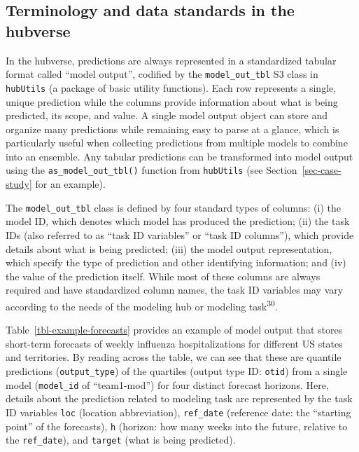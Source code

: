 \documentclass[
]{article}
\begin{document}
\subsection{Terminology and data standards in the
hubverse}\label{terminology-and-data-standards-in-the-hubverse}

In the hubverse, predictions are always represented in a standardized
tabular format called ``model output'', codified by the
\texttt{model\_out\_tbl} S3 class in \texttt{hubUtils} (a package of
basic utility functions). Each row represents a single, unique
prediction while the columns provide information about what is being
predicted, its scope, and value. A single model output object can store
and organize many predictions while remaining easy to parse at a glance,
which is particularly useful when collecting predictions from multiple
models to combine into an ensemble. Any tabular predictions can be
transformed into model output using the \texttt{as\_model\_out\_tbl()}
function from \texttt{hubUtils} (see Section~\ref{sec-case-study} for an
example).

The \texttt{model\_out\_tbl} class is defined by four standard types of
columns: (i) the model ID, which denotes which model has produced the
prediction; (ii) the task IDs (also referred to as ``task ID variables''
or ``task ID columns''), which provide details about what is being
predicted; (iii) the model output representation, which specify the type
of prediction and other identifying information; and (iv) the value of
the prediction itself. While most of these columns are always required
and have standardized column names, the task ID variables may vary
according to the needs of the modeling hub or modeling
task\textsuperscript{30}.

Table~\ref{tbl-example-forecasts} provides an example of model output
that stores short-term forecasts of weekly influenza hospitalizations
for different US states and territories. By reading across the table, we
can see that these are quantile predictions (\texttt{output\_type}) of
the quartiles (output type ID: \texttt{otid}) from a single model
(\texttt{model\_id} of ``team1-mod'') for four distinct forecast
horizons. Here, details about the prediction related to modeling task
are represented by the task ID variables \texttt{loc} (location
abbreviation), \texttt{ref\_date} (reference date: the ``starting
point'' of the forecasts), \texttt{h} (horizon: how many weeks into the
future, relative to the \texttt{ref\_date}), and \texttt{target} (what
is being predicted).
\end{document}
